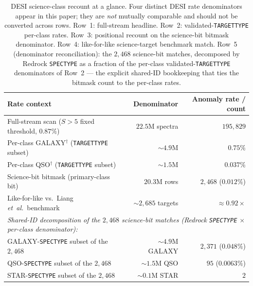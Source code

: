 \documentclass[aps,prd,twocolumn,superscriptaddress,showpacs,preprintnumbers,nofootinbib,longbibliography,floatfix]{revtex4-2}
\newcommand{\etal}{\textit{et~al.}}
\begin{document}
\begin{table}[!htb]
\caption{\label{tab:recount} DESI science-class recount at a glance. Four distinct DESI rate denominators appear in this paper; they are \emph{not} mutually comparable and should not be converted across rows. Row~1: full-stream headline. Row~2: validated-\texttt{TARGETTYPE} per-class rates. Row~3: positional recount on the science-bit bitmask denominator. Row~4: like-for-like science-target benchmark match. Row~5 (denominator reconciliation): the $2{,}468$ science-bit matches, decomposed by Redrock \texttt{SPECTYPE} as a fraction of the per-class validated-\texttt{TARGETTYPE} denominators of Row~2 --- the explicit shared-ID bookkeeping that ties the bitmask count to the per-class rates.}
\small
\begin{ruledtabular}
\begin{tabular}{lrr}
\textbf{Rate context} & \textbf{Denominator} & \textbf{Anomaly rate / count} \\
\hline
Full-stream scan ($S>5$ fixed threshold, $0.87\%$)   & $22.5$M spectra   & $195{,}829$ \\
Per-class GALAXY$^\dagger$ (\texttt{TARGETTYPE} subset) & ${\sim}4.9$M & $0.75\%$ \\
Per-class QSO$^\dagger$ (\texttt{TARGETTYPE} subset)    & ${\sim}1.5$M & $0.037\%$ \\
Science-bit bitmask (primary-class bit) & $20.3$M rows  & $2{,}468$ ($0.012\%$) \\
Like-for-like vs.\ Liang \etal~benchmark & ${\sim}2{,}685$ targets & ${\approx}0.92\times$ \\
\hline
\multicolumn{3}{l}{\emph{Shared-ID decomposition of the $2{,}468$ science-bit matches (Redrock \texttt{SPECTYPE} $\times$ per-class denominator):}} \\
\quad GALAXY-\texttt{SPECTYPE} subset of the $2{,}468$ & ${\sim}4.9$M GALAXY  & $2{,}371$ ($0.048\%$) \\
\quad QSO-\texttt{SPECTYPE}    subset of the $2{,}468$ & ${\sim}1.5$M QSO     & $95$ ($0.0063\%$) \\
\quad STAR-\texttt{SPECTYPE}   subset of the $2{,}468$ & ${\sim}0.1$M STAR    & $2$ \\
\end{tabular}
\end{ruledtabular}

\end{table}
\end{document}
